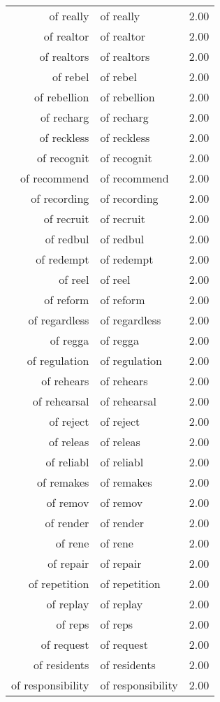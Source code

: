 \begin{table}[ht]
\begin{tabular}{rlr}
  of really & of really & 2.00 \\ 
  of realtor & of realtor & 2.00 \\ 
  of realtors & of realtors & 2.00 \\ 
  of rebel & of rebel & 2.00 \\ 
  of rebellion & of rebellion & 2.00 \\ 
  of recharg & of recharg & 2.00 \\ 
  of reckless & of reckless & 2.00 \\ 
  of recognit & of recognit & 2.00 \\ 
  of recommend & of recommend & 2.00 \\ 
  of recording & of recording & 2.00 \\ 
  of recruit & of recruit & 2.00 \\ 
  of redbul & of redbul & 2.00 \\ 
  of redempt & of redempt & 2.00 \\ 
  of reel & of reel & 2.00 \\ 
  of reform & of reform & 2.00 \\ 
  of regardless & of regardless & 2.00 \\ 
  of regga & of regga & 2.00 \\ 
  of regulation & of regulation & 2.00 \\ 
  of rehears & of rehears & 2.00 \\ 
  of rehearsal & of rehearsal & 2.00 \\ 
  of reject & of reject & 2.00 \\ 
  of releas & of releas & 2.00 \\ 
  of reliabl & of reliabl & 2.00 \\ 
  of remakes & of remakes & 2.00 \\ 
  of remov & of remov & 2.00 \\ 
  of render & of render & 2.00 \\ 
  of rene & of rene & 2.00 \\ 
  of repair & of repair & 2.00 \\ 
  of repetition & of repetition & 2.00 \\ 
  of replay & of replay & 2.00 \\ 
  of reps & of reps & 2.00 \\ 
  of request & of request & 2.00 \\ 
  of residents & of residents & 2.00 \\ 
  of responsibility & of responsibility & 2.00 \\ 

\end{tabular}
\end{table}
